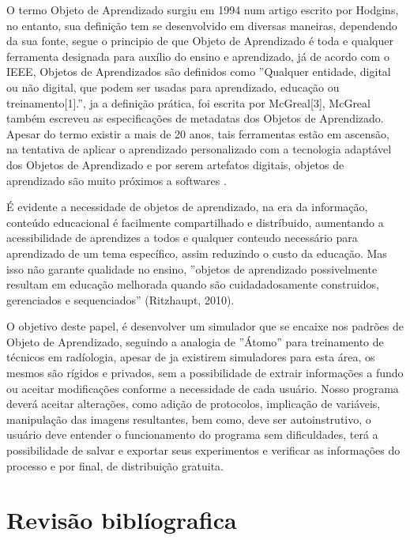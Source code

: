 \documentclass[12pt,openright,oneside,a4paper,english,french,spanish,brazil]{unifil}
\begin{document}
O termo Objeto de Aprendizado surgiu em 1994  num artigo escrito por Hodgins, no entanto, sua definição tem se desenvolvido em diversas maneiras, dependendo da sua fonte, segue o principio de que Objeto de Aprendizado é toda e qualquer ferramenta designada para auxílio do ensino e aprendizado, já de acordo com o IEEE, Objetos de Aprendizados são definidos como ''Qualquer entidade, digital ou não digital, que podem ser usadas para aprendizado, educação ou treinamento[1].'', ja a definição prática, foi escrita por McGreal[3], McGreal também escreveu as especificações de metadatas dos Objetos de Aprendizado. Apesar do termo existir a mais de 20 anos, tais ferramentas estão em ascensão, na tentativa de aplicar o aprendizado personalizado com a tecnologia adaptável dos Objetos de Aprendizado e por serem artefatos digitais, objetos de aprendizado são muito próximos a softwares \citeyear{Braga:2012}.
	
	É evidente a necessidade de objetos de aprendizado, na era da informação, conteúdo educacional é facilmente compartilhado e distríbuido, aumentando a acessibilidade de aprendizes a todos e qualquer conteudo necessário para aprendizado de um tema específico, assim reduzindo o custo da educação. Mas isso não garante qualidade no ensino, ''objetos de aprendizado possivelmente resultam em educação melhorada quando são cuidadadosamente construidos, gerenciados e sequenciados'' (Ritzhaupt, 2010).
	
	O objetivo deste papel, é desenvolver um simulador que se encaixe nos padrões de Objeto de Aprendizado, seguindo a analogia de ''Átomo'' para treinamento de técnicos em radíologia, apesar de ja existirem simuladores para esta área, os mesmos são rígidos e privados, sem a possibilidade de extrair informações a fundo ou aceitar modificações conforme a necessidade de cada usuário. Nosso programa deverá aceitar alterações, como adição de protocolos, implicação de variáveis, manipulação das imagens resultantes, bem como, deve ser autoinstrutivo, o usuário deve entender o funcionamento do programa sem dificuldades, terá a possibilidade de salvar e exportar seus experimentos e verificar as informações do processo e por final, de distribuição gratuita.

\chapter{Revisão biblíografica}%
\end{document}
